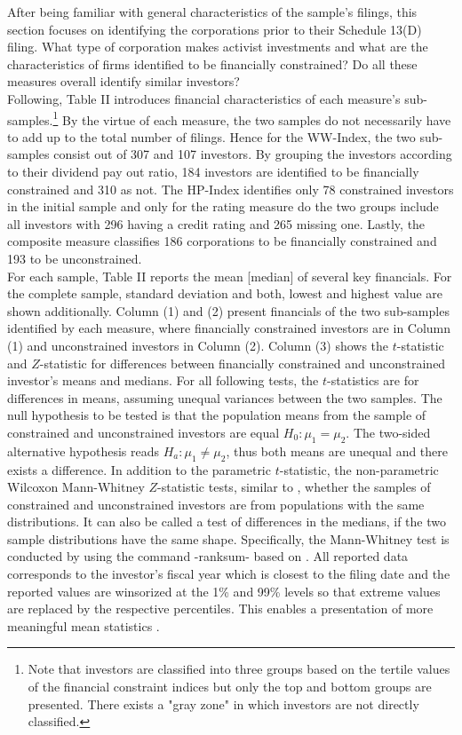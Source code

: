 \documentclass[12pt]{article}
\begin{document}
After being familiar with general characteristics of the sample's filings, this section focuses on identifying the corporations prior to their Schedule 13(D) filing. What type of corporation makes activist investments and what are the characteristics of firms identified to be financially constrained? Do all these measures overall identify similar investors?\\
Following, Table II introduces financial characteristics of each measure's sub-samples.\footnote{Note that investors are classified into three groups based on the tertile values of the financial constraint indices but only the top and bottom groups are presented. There exists a "gray zone" in which investors are not directly classified.} By the virtue of each measure, the two samples do not necessarily have to add up to the total number of filings. Hence for the WW-Index, the two sub-samples consist out of 307 and 107 investors. By grouping the investors according to their dividend pay out ratio, 184 investors are identified to be financially constrained and 310 as not. The HP-Index identifies only 78 constrained investors in the initial sample and only for the rating measure do the two groups include all investors with 296 having a credit rating and 265 missing one. Lastly, the composite measure classifies 186 corporations to be financially constrained and 193 to be unconstrained.\\
For each sample, Table II reports the mean [median] of several key financials. For the complete sample, standard deviation and both, lowest and highest value are shown additionally. Column (1) and (2) present financials of the two sub-samples identified by each measure, where financially constrained investors are in Column (1) and unconstrained investors in Column (2). Column (3) shows the $t$-statistic and $Z$-statistic for differences between financially constrained and unconstrained investor's means and medians. For all following tests, the $t$-statistics are for differences in means, assuming unequal variances between the two samples. The null hypothesis to be tested is that the population means from the sample of constrained and unconstrained investors are equal $H_{0}: \mu_{1}=\mu_{2}$. The two-sided alternative hypothesis reads $H_{a}: \mu_{1}\neq\mu_{2}$, thus both means are unequal and there exists a difference. In addition to the parametric $t$-statistic, the non-parametric Wilcoxon Mann-Whitney $Z$-statistic tests, similar to \citet[p.201]{Klein2009}, whether the samples of constrained and unconstrained investors are from populations with the same distributions. It can also be called a test of differences in the medians, if the two sample distributions have the same shape. Specifically, the Mann-Whitney test is conducted by using the command -ranksum- based on \citet[p.59]{Mann1947}. All reported data corresponds to the investor's fiscal year which is closest to the filing date and the reported values are winsorized at the 1\% and 99\% levels so that extreme values are replaced by the respective percentiles. This enables a presentation of more meaningful mean statistics \citep[p.203]{Klein2009}.   
\end{document}
